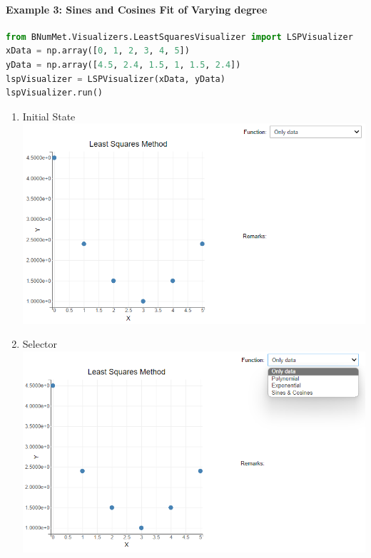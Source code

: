 \paragraph{Example 3: Sines and Cosines Fit of Varying degree}{
\begin{lstlisting}[language=Python]
from BNumMet.Visualizers.LeastSquaresVisualizer import LSPVisualizer
xData = np.array([0, 1, 2, 3, 4, 5])
yData = np.array([4.5, 2.4, 1.5, 1, 1.5, 2.4])
lspVisualizer = LSPVisualizer(xData, yData)
lspVisualizer.run()
\end{lstlisting}

\begin{enumerate}
    \item Initial State\\
    \includegraphics[scale=0.6]{Include/Images/Thesis/Documentation/Visualizers/LeastSquares/Example 1/Example 1 - 00 - Initial State.png}
    \item Selector\\
    \includegraphics[scale=0.6]{Include/Images/Thesis/Documentation/Visualizers/LeastSquares/Example 1/Example 1 - 00 - Selector.png}

\end{enumerate}}
